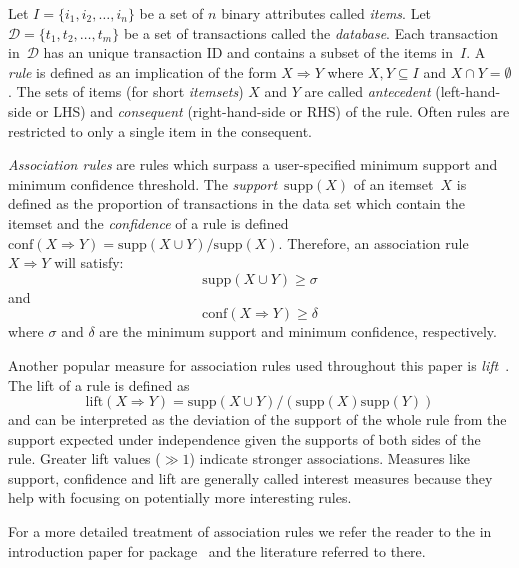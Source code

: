 \documentclass[nojss]{jss}
\newcommand{\set}[1]{\mathcal{#1}}
\begin{document}
Let $I=\{i_1, i_2,\ldots,i_n\}$ be a set of $n$ binary attributes called
\emph{items}.  Let $\set{D} = \{t_1, t_2, \ldots, t_m\}$ be a set of
transactions called the \emph{database}. Each transaction in~$\set{D}$ has an
unique transaction ID and contains a subset of the items in~$I$.  A \emph{rule}
is defined as an implication of the form $X \Rightarrow Y$ where $X, Y
\subseteq I$ and $X \cap Y = \emptyset$.  The sets of items (for short
\emph{itemsets}) $X$ and $Y$ are called \emph{antecedent} (left-hand-side or
LHS) and \emph{consequent} (right-hand-side or RHS) of the rule.
Often rules are restricted to only a single item in the consequent.

\emph{Association rules} are rules which surpass a user-specified
minimum support
and minimum confidence threshold. The \emph{support}~$\mathrm{supp}(X)$ of an itemset~$X$
is defined as the proportion of transactions in the data set which contain the
itemset and the \emph{confidence} of a rule is defined
$\mathrm{conf}(X\Rightarrow Y) = \mathrm{supp}(X \cup Y) / \mathrm{supp}(X)$.
Therefore, an association rule $X\Rightarrow Y$ will satisfy:
$$\mathrm{supp}(X\cup Y) \ge \sigma$$
and
$$\mathrm{conf}(X\Rightarrow Y) \ge \delta$$
where $\sigma$ and $\delta$ are the minimum support and minimum confidence,
respectively.

Another popular measure for association rules used throughout this paper
is \emph{lift}~\citep{arules:Brin+Motwani+Ullman+Tsur:1997}.
The lift of a rule is defined as
$$\mathrm{lift}(X \Rightarrow Y) = \mathrm{supp}(X\cup Y)/(\mathrm{supp}(X)\mathrm{supp}(Y))$$
and can be interpreted as the deviation of the support of the whole
rule from the support expected under independence given the supports
of both sides of the rule.
Greater lift values ($\gg 1$) indicate stronger associations.
Measures like support, confidence and lift are generally called
interest measures because they help with focusing on
potentially more interesting rules.


For a more detailed treatment of association rules we refer the reader to
the in introduction paper for package~
\citep{arulesViz:Hahsler:2010, arulesViz:Hahsler:2005}
and the literature referred to there.
\end{document}
